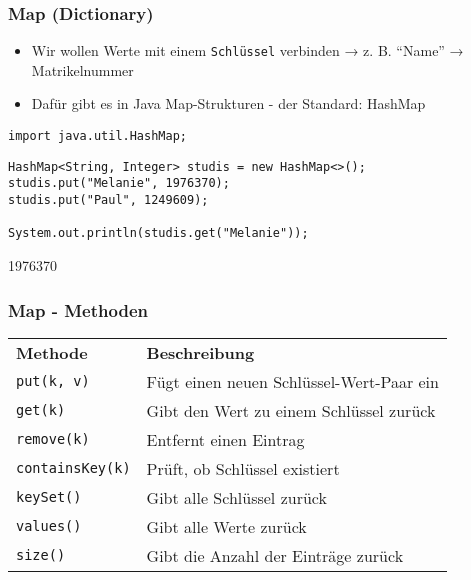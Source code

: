 \documentclass{../../presentation}
\begin{document}
\begin{frame}[fragile]
	\frametitle{Map (Dictionary)}
	\begin{itemize}
		\item Wir wollen Werte mit einem \texttt{Schlüssel} verbinden → z. B. “Name” → Matrikelnummer
		\item Dafür gibt es in Java Map-Strukturen - der Standard: HashMap
	\end{itemize}
	\begin{verbatim}
import java.util.HashMap;
	\end{verbatim}
	\begin{verbatim}
HashMap<String, Integer> studis = new HashMap<>();
studis.put("Melanie", 1976370);
studis.put("Paul", 1249609);

System.out.println(studis.get("Melanie"));
	\end{verbatim}
	\begin{ausgabe}
		1976370
	\end{ausgabe}
\end{frame}

\begin{frame}
	\frametitle{Map - Methoden}
	\begin{table}[h]
		\centering
		\begin{tabular}{l l}
			\rowcolor{tablehead}
			\textbf{Methode}        & \textbf{Beschreibung}                    \\
			\texttt{put(k, v)}      & Fügt einen neuen Schlüssel-Wert-Paar ein \\
			\texttt{get(k)}         & Gibt den Wert zu einem Schlüssel zurück  \\
			\texttt{remove(k)}      & Entfernt einen Eintrag                   \\
			\texttt{containsKey(k)} & Prüft, ob Schlüssel existiert            \\
			\texttt{keySet()}       & Gibt alle Schlüssel zurück               \\
			\texttt{values()}       & Gibt alle Werte zurück                   \\
			\texttt{size()}         & Gibt die Anzahl der Einträge zurück      \\
		\end{tabular}
	\end{table}
\end{frame}
\end{document}
